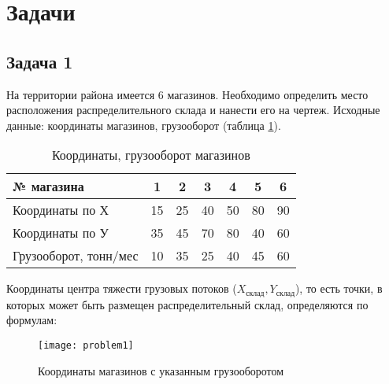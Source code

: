 \section{Задачи}
\subsection{Задача 1}
На территории района имеется 6 магазинов.
Необходимо определить место расположения распределительного склада и нанести его на чертеж.
Исходные данные: координаты магазинов, грузооборот (таблица \ref{coord}).

\begin{table}[h!]
	\centering
	\caption{Координаты, грузооборот магазинов}
	\label{coord}
	\begin{tabular}{|l|c|c|c|c|c|c|}
		\hline
		№ магазина      & 1  & 2  & 3  & 4  & 5  & 6  \\ \hline
		Координаты по Х & 15 & 25 & 40 & 50 & 80 & 90 \\ \hline
		Координаты по У & 35 & 45 & 70 & 80 & 40 & 60 \\ \hline
		Грузооборот, тонн/мес &10&35&25&40&45&60 \\ \hline
	\end{tabular}
\end{table}

Координаты центра тяжести грузовых потоков ($X_{склад}, Y_{склад}$), то есть точки, в которых может быть размещен распределительный склад, определяются по формулам:

\begin{figure}[h]
	\centering
	\texttt{[image: problem1]}
	\caption{Координаты магазинов с указанным грузооборотом}
	\label{fig:problem1}
\end{figure}
